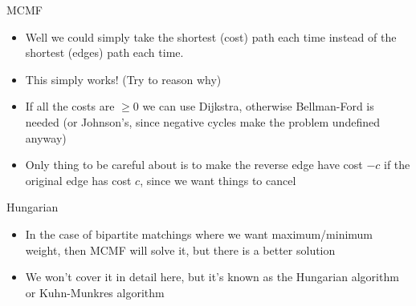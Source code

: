 \documentclass{beamer}
\begin{document}
	\begin{frame}[plain]{MCMF}
		\begin{itemize}
			\item Well we could simply take the shortest (cost) path each time instead of the shortest (edges) path each time.
			\item This simply works! (Try to reason why)
			\item If all the costs are $\geq 0$ we can use Dijkstra, otherwise Bellman-Ford is needed (or Johnson's, since negative cycles make the problem undefined anyway)
			\item Only thing to be careful about is to make the reverse edge have cost $-c$ if the original edge has cost $c$, since we want things to cancel
		\end{itemize}
	\end{frame}
	
	
	\begin{frame}[plain]{Hungarian}
		\begin{itemize}
			\item In the case of bipartite matchings where we want maximum/minimum weight, then MCMF will solve it, but there is a better solution
			\item We won't cover it in detail here, but it's known as the Hungarian algorithm or Kuhn-Munkres algorithm
		\end{itemize}
	\end{frame}
\end{document}
